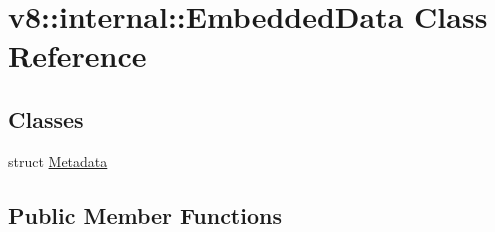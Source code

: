\hypertarget{classv8_1_1internal_1_1EmbeddedData}{}\section{v8\+:\+:internal\+:\+:Embedded\+Data Class Reference}
\label{classv8_1_1internal_1_1EmbeddedData}
\subsection*{Classes}
\begin{DoxyCompactItemize}
\item 
struct \mbox{\hyperlink{structv8_1_1internal_1_1EmbeddedData_1_1Metadata}{Metadata}}
\end{DoxyCompactItemize}
\subsection*{Public Member Functions}
